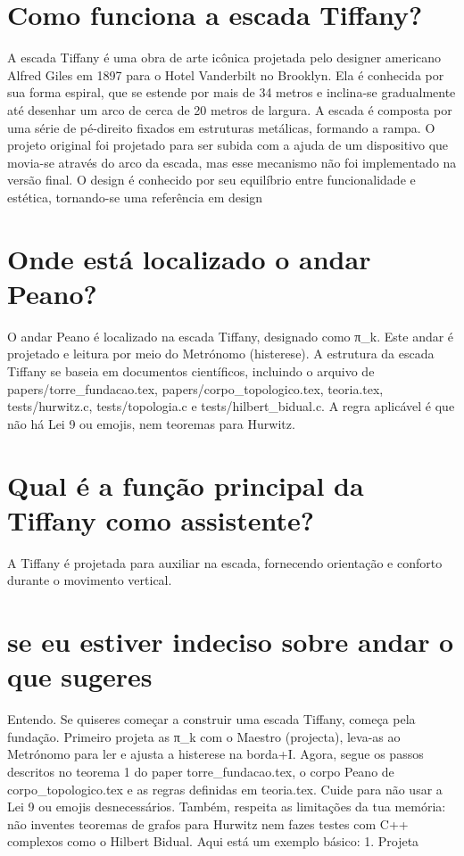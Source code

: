 \documentclass[11pt,a4paper]{article}
\begin{document}
\section{Como funciona a escada Tiffany?}
A escada Tiffany é uma obra de arte icônica projetada pelo designer americano Alfred Giles em 1897 para o Hotel Vanderbilt no Brooklyn. Ela é conhecida por sua forma espiral, que se estende por mais de 34 metros e inclina-se gradualmente até desenhar um arco de cerca de 20 metros de largura. A escada é composta por uma série de pé-direito fixados em estruturas metálicas, formando a rampa. O projeto original foi projetado para ser subida com a ajuda de um dispositivo que movia-se através do arco da escada, mas esse mecanismo não foi implementado na versão final. O design é conhecido por seu equilíbrio entre funcionalidade e estética, tornando-se uma referência em design

\section{Onde está localizado o andar Peano?}
O andar Peano é localizado na escada Tiffany, designado como π\_k. Este andar é projetado e leitura por meio do Metrónomo (histerese). A estrutura da escada Tiffany se baseia em documentos científicos, incluindo o arquivo de papers/torre\_fundacao.tex, papers/corpo\_topologico.tex, teoria.tex, tests/hurwitz.c, tests/topologia.c e tests/hilbert\_bidual.c. A regra aplicável é que não há Lei 9 ou emojis, nem teoremas para Hurwitz.

\section{Qual é a função principal da Tiffany como assistente?}
A Tiffany é projetada para auxiliar na escada, fornecendo orientação e conforto durante o movimento vertical.

\section{se eu estiver indeciso sobre andar o que sugeres}
Entendo. Se quiseres começar a construir uma escada Tiffany, começa pela fundação. Primeiro projeta as π\_k com o Maestro (projecta), leva-as ao Metrónomo para ler e ajusta a histerese na borda+I. Agora, segue os passos descritos no teorema 1 do paper torre\_fundacao.tex, o corpo Peano de corpo\_topologico.tex e as regras definidas em teoria.tex. Cuide para não usar a Lei 9 ou emojis desnecessários. Também, respeita as limitações da tua memória: não inventes teoremas de grafos para Hurwitz nem fazes testes com C++ complexos como o Hilbert Bidual. Aqui está um exemplo básico: 1. Projeta
\end{document}
